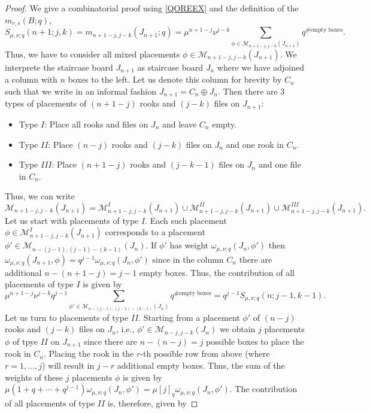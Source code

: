 \documentclass[10pt]{amsart}
\begin{document}
\begin{proof} We give a combinatorial proof using \eqref{QOREEX} and the definition of the $m_{r,s}(B;q)$,
$$
S_{\mu,\nu;q}(n+1;j,k)=m_{n+1-j,j-k}(J_{n+1};q)=\mu^{n+1-j}\nu^{j-k}\sum_{\phi \in \mathcal{M}_{n+1-j,j-k}(J_{n+1})} q^{\# \mbox{empty boxes}}.
$$ 
Thus, we have to consider all mixed placements $\phi \in \mathcal{M}_{n+1-j,j-k}(J_{n+1})$. We interprete the staircase board $J_{n+1}$ as staircase board $J_n$ where we have adjoined a column with $n$ boxes to the left. Let us denote this column for brevity by $C_n$ such that we write in an informal fashion $J_{n+1}=C_n \oplus J_n$. Then there are 3 types of placements of $(n+1-j)$ rooks and $(j-k)$ files on $J_{n+1}$:
\begin{itemize}
\item Type $I$: Place all rooks and files on $J_n$ and leave $C_n$ empty.
\item Type $II$: Place $(n-j)$ rooks and $(j-k)$ files on $J_{n}$ and one rook in $C_n$.
\item Type $III$: Place $(n+1-j)$ rooks and $(j-k-1)$ files on $J_{n}$ and one file in $C_n$.
\end{itemize} 
Thus, we can write
$$
\mathcal{M}_{n+1-j,j-k}(J_{n+1})=\mathcal{M}_{n+1-j,j-k}^{I}(J_{n+1})\cup\mathcal{M}_{n+1-j,j-k}^{II}(J_{n+1})\cup  \mathcal{M}_{n+1-j,j-k}^{III}(J_{n+1}).
$$
Let us start with placements of type $I$. Each such placement  $\phi  \in \mathcal{M}_{n+1-j,j-k}^{I}(J_{n+1})$ corresponds to a placement $\phi' \in \mathcal{M}_{n-(j-1),(j-1)-(k-1)}(J_{n})$. If $\phi'$ has weight $\omega_{\mu,\nu;q}(J_n,\phi')$ then $\omega_{\mu,\nu;q}(J_{n+1},\phi)=q^{j-1}\omega_{\mu,\nu;q}(J_n,\phi')$ since in the column $C_n$ there are additional $n-(n+1-j)=j-1$ empty boxes. Thus, the contribution of all placements of type $I$ is given by
$$
\mu^{n+1-j}\nu^{j-k}q^{j-1}\sum_{\phi' \in \mathcal{M}_{n-(j-1),(j-1)-(k-1)}(J_{n})} q^{\# \mbox{empty boxes}} =q^{j-1}S_{\mu,\nu;q}(n;j-1,k-1).
$$
Let us turn to placements of type $II$. Starting from a placement $\phi' $ of $(n-j)$ rooks and $(j-k)$ files on $J_{n}$, i.e., 
$\phi' \in \mathcal{M}_{n-j,j-k}(J_{n})$ we obtain $j$ placements $\phi$ of tpye $II$ on $J_{n+1}$ since there are $n-(n-j)=j$ possible boxes to place the rook in $C_n$. Placing the rook in the $r$-th possible row from above (where $r=1,\ldots,j$) will result in $j-r$ additional empty boxes. Thus, the sum of the weights of these $j$ placements $\phi$ is given by $\mu (1+q+\cdots+q^{j-1})\omega_{\mu,\nu;q}(J_n,\phi')=\mu [j]_q \omega_{\mu,\nu;q}(J_n,\phi')$. The contribution of all placements of type $II$ is, therefore, given by

\end{proof}
\end{document}
